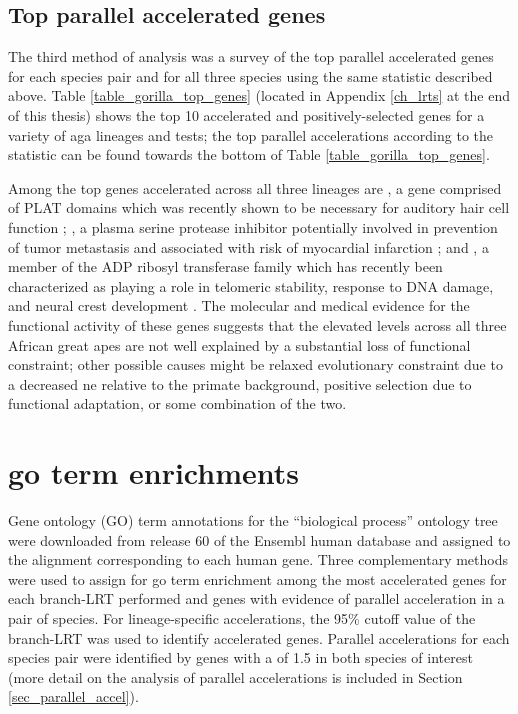 \subsection{Top parallel accelerated genes}

The third method of analysis was a survey of the top parallel
accelerated genes for each species pair and for all three species
using the same \lrtmin statistic described above. Table
\ref{table_gorilla_top_genes} (located in Appendix \ref{ch_lrts} at
the end of this thesis) shows the top 10 accelerated and
positively-selected genes for a variety of \ac{aga} lineages and
tests; the top parallel accelerations according to the \lrtmin
statistic can be found towards the bottom of Table
\ref{table_gorilla_top_genes}.

Among the top genes accelerated across all three lineages are
, a gene comprised of PLAT domains which was recently
shown to be necessary for auditory hair cell function
\citep{Edvardson2011}; , a plasma serine protease
inhibitor potentially involved in prevention of tumor metastasis and
associated with risk of myocardial infarction \citep{Ebana2007}; and
, a member of the ADP ribosyl transferase family which has
recently been characterized as playing a role in telomeric stability,
response to DNA damage, and neural crest development
\citep{Rouleau2011,Boehler2011}. The molecular and medical evidence
for the functional activity of these genes suggests that the elevated
\dnds levels across all three African great apes are not well
explained by a substantial loss of functional constraint; other
possible causes might be relaxed evolutionary constraint due to a
decreased \ac{ne} relative to the primate
background, positive selection due to functional adaptation, or some
combination of the two. 

\section{\acf{go} term enrichments}
\label{sec_gorilla_go}

Gene ontology (GO) term annotations for the ``biological process''
ontology tree were downloaded from release 60 of the Ensembl human
database \citep{Flicek2011} and assigned to the alignment
corresponding to each human gene. Three complementary methods were
used to assign \pvs for \ac{go} term enrichment among the most
accelerated genes for each branch-LRT performed and genes with
evidence of parallel acceleration in a pair of species. For
lineage-specific accelerations, the 95\% \chisq cutoff value of the
branch-LRT was used to identify accelerated genes. Parallel
accelerations for each species pair were identified by genes with a
\lrtmin of 1.5 in both species of interest (more detail on the
analysis of parallel accelerations is included in Section
\ref{sec_parallel_accel}). 

